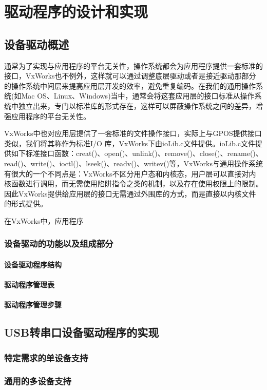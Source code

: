 \chapter{驱动程序的设计和实现}

\section{设备驱动概述}
	通常为了实现与应用程序的平台无关性，操作系统都会为应用程序提供一套标准的接口，VxWorks也不例外，这样就可以通过调整底层驱动或者是接近驱动那部分的操作系统中间层来提高应用层开发的效率，避免重复编码。在我们的通用操作系统(如Mac OS、Linux、Windows)当中，通常会将这套应用层的接口标准从操作系统中独立出来，专门以标准库的形式存在，这样可以屏蔽操作系统之间的差异，增强应用程序的平台无关性。
	
	VxWorks中也对应用层提供了一套标准的文件操作接口，实际上与GPOS提供接口类似，我们将其称作为标准I/O 库，VxWorks下由ioLib.c文件提供。ioLib.c文件提供如下标准接口函数：creat()、open()、unlink()、remove()、close()、rename()、read()、write()、ioctl()、lseek()、readv()、writev()等\cite{BSP开发人员指南}，VxWorks与通用操作系统有很大的一个不同点是：VxWorks不区分用户态和内核态，用户层可以直接对内核函数进行调用，而无需使用陷阱指令之类的机制，以及存在使用权限上的限制。因此VxWorks提供给应用层的接口无需通过外围库的方式，而是直接以内核文件的形式提供。
	
	在VxWorks中，应用程序


\subsection{设备驱动的功能以及组成部分}
\subsubsection{设备驱动程序结构}
\subsubsection{驱动程序管理表}
\subsubsection{驱动程序管理步骤}







\section{USB转串口设备驱动程序的实现}

\subsection{特定需求的单设备支持}


\subsection{通用的多设备支持}